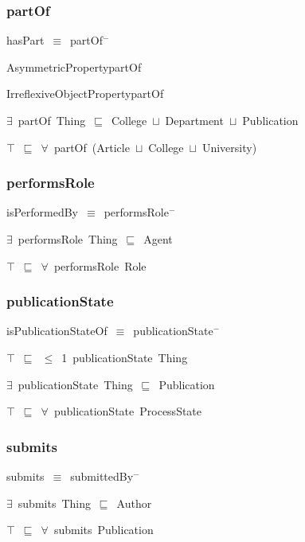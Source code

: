 \documentclass{article}
\begin{document}
\subsubsection*{partOf}

hasPart~\ensuremath{\equiv}~partOf\ensuremath{^-}

AsymmetricPropertypartOf

IrreflexiveObjectPropertypartOf

\ensuremath{\exists}~partOf~Thing~\ensuremath{\sqsubseteq}~College~\ensuremath{\sqcup}~Department~\ensuremath{\sqcup}~Publication

\ensuremath{\top}~\ensuremath{\sqsubseteq}~\ensuremath{\forall}~partOf~(Article~\ensuremath{\sqcup}~College~\ensuremath{\sqcup}~University)

\subsubsection*{performsRole}

isPerformedBy~\ensuremath{\equiv}~performsRole\ensuremath{^-}

\ensuremath{\exists}~performsRole~Thing~\ensuremath{\sqsubseteq}~Agent

\ensuremath{\top}~\ensuremath{\sqsubseteq}~\ensuremath{\forall}~performsRole~Role

\subsubsection*{publicationState}

isPublicationStateOf~\ensuremath{\equiv}~publicationState\ensuremath{^-}

\ensuremath{\top}~\ensuremath{\sqsubseteq}~\ensuremath{\leq}~1~publicationState~Thing

\ensuremath{\exists}~publicationState~Thing~\ensuremath{\sqsubseteq}~Publication

\ensuremath{\top}~\ensuremath{\sqsubseteq}~\ensuremath{\forall}~publicationState~ProcessState

\subsubsection*{submits}

submits~\ensuremath{\equiv}~submittedBy\ensuremath{^-}

\ensuremath{\exists}~submits~Thing~\ensuremath{\sqsubseteq}~Author

\ensuremath{\top}~\ensuremath{\sqsubseteq}~\ensuremath{\forall}~submits~Publication
\end{document}
